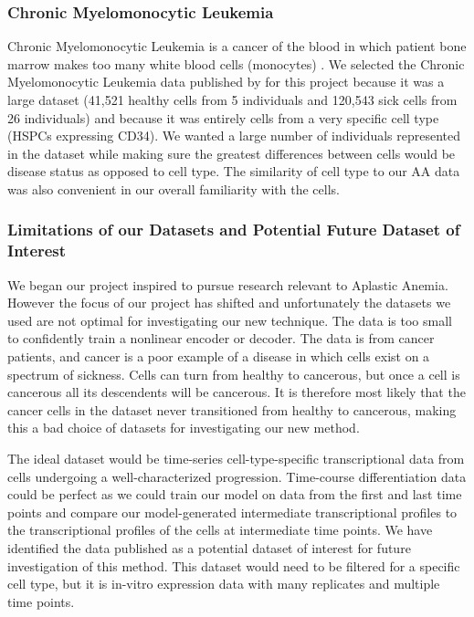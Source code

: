 \documentclass{article}
\begin{document}
\subsubsection{Chronic Myelomonocytic Leukemia}
Chronic Myelomonocytic Leukemia is a cancer of the blood in which patient bone marrow makes too many white blood cells (monocytes) \citep{ferrall-fairbanks_progenitor_2022}.
We selected the Chronic Myelomonocytic Leukemia data published by \citet{ferrall-fairbanks_progenitor_2022} for this project because it was a large dataset (41,521 healthy cells from 5 individuals and 120,543 sick cells from 26 individuals) and because it was entirely cells from a very specific cell type (HSPCs expressing CD34).
We wanted a large number of individuals represented in the dataset while making sure the greatest differences between cells would be disease status as opposed to cell type.
The similarity of cell type to our AA data was also convenient in our overall familiarity with the cells.

\subsubsection{Limitations of our Datasets and Potential Future Dataset of Interest}
We began our project inspired to pursue research relevant to Aplastic Anemia.
However the focus of our project has shifted and unfortunately the datasets we used are not optimal for investigating our new technique.
The \citet{tonglin_single-cell_2022} data is too small to confidently train a nonlinear encoder or decoder.
The \citet{ferrall-fairbanks_progenitor_2022} data is from cancer patients, and cancer is a poor example of a disease in which cells exist on a spectrum of sickness.
Cells can turn from healthy to cancerous, but once a cell is cancerous all its descendents will be cancerous.
It is therefore most likely that the cancer cells in the dataset never transitioned from healthy to cancerous, making this a bad choice of datasets for investigating our new method.

The ideal dataset would be time-series cell-type-specific transcriptional data from cells undergoing a well-characterized progression.
Time-course differentiation data could be perfect as we could train our model on data from the first and last time points and compare our model-generated intermediate transcriptional profiles to the transcriptional profiles of the cells at intermediate time points.
We have identified the data published \citet{lu_single-cell_2020} as a potential dataset of interest for future investigation of this method.
This dataset would need to be filtered for a specific cell type, but it is in-vitro expression data with many replicates and multiple time points.
\end{document}
